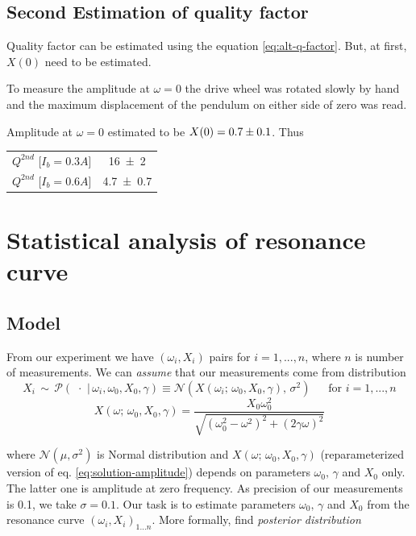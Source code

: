 \documentclass[12pt,a4paper]{article}
\begin{document}
   \subsection{Second Estimation of quality factor} \label{section:qualiti-factor-estimation-2nd}
   Quality factor can be estimated using the equation \ref{eq:alt-q-factor}. But, at first, $X(0)$ need to be estimated.
   
   To measure the amplitude at $\omega=0$ the drive wheel was rotated  slowly by hand and the maximum displacement of the pendulum on either side of zero was read.
   
   Amplitude at $\omega = 0$ estimated to be $X(0) = \num{0.7 \pm 0.1}$. Thus
   \begin{table}[H]\centering
   	\begin{tabular}{c c} 
   		\toprule
   		$Q^{2nd}$ [$I_b=0.3A$] & \num{16 \pm 2} \\
   		$Q^{2nd}$ [$I_b=0.6A$] & \num{4.7 \pm 0.7} \\
   		\bottomrule
   	\end{tabular}
   \end{table}
  \section{Statistical analysis of resonance curve}\label{section:stan}
  \subsection{Model}
  From our experiment we have $(\omega_i, X_i)$ pairs for $i=1,...,n$, where $n$ is number of measurements. We can \textit{assume} that our measurements come from distribution
  \begin{equation}\label{eq:distribution}
  X_i \, \sim \,  
  \mathcal{P}(\,\, \cdot \,\, | \, \omega_i, \omega_0, X_0, \gamma) \equiv \mathcal{N}(X(\omega_i; \, \omega_0, X_0, \gamma),\,\sigma^{2})\ \quad 
  \text{   for   } i=1,...,n
  \end{equation}
  \begin{equation}\label{eq:solution-amplitude-new}
  X(\omega; \, \omega_0, X_0, \gamma) = \frac{X_0 \omega_0^2}{\sqrt{(\omega_0^2-\omega^2)^2+(2 \gamma \omega)^2}}
  \end{equation}
  
  where $\mathcal{N}(\mu, \sigma^2)$ is Normal distribution and $X(\omega; \, \omega_0, X_0, \gamma)$ (reparameterized version of eq. \ref{eq:solution-amplitude}) depends on parameters $\omega_0,\, \gamma$ and $X_0$ only. The latter one is amplitude at zero frequency.
  As precision of our measurements is 0.1, we take  $\sigma = 0.1$.
  Our task is to estimate parameters $\omega_0,\, \gamma$ and $X_0$ from the resonance curve $(\omega_i, X_i)_{1...n}$. More formally, find \textit{posterior distribution}
  
\end{document}
